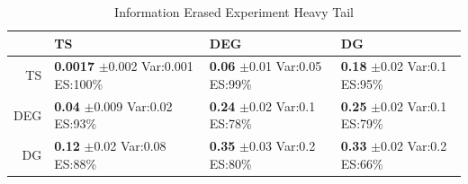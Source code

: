 \documentclass[11pt,letterpaper]{article}
\begin{document}
\begin{table}[H]
\centering
\caption{Information Erased Experiment Heavy Tail} 
\begin{tabular}{rlll}
  \hline
 & TS & DEG &  DG \\ 
  \hline
TS & \makecell{\textbf{0.0017} $\pm$0.002\\Var:0.001\\ES:100\%} & \makecell{\textbf{0.06} $\pm$0.01\\Var:0.05\\ES:99\%} & \makecell{\textbf{0.18} $\pm$0.02\\Var:0.1\\ES:95\%} \\ 
  DEG & \makecell{\textbf{0.04} $\pm$0.009\\Var:0.02\\ES:93\%} & \makecell{\textbf{0.24} $\pm$0.02\\Var:0.1\\ES:78\%} & \makecell{\textbf{0.25} $\pm$0.02\\Var:0.1\\ES:79\%} \\ 
   DG & \makecell{\textbf{0.12} $\pm$0.02\\Var:0.08\\ES:88\%} & \makecell{\textbf{0.35} $\pm$0.03\\Var:0.2\\ES:80\%} & \makecell{\textbf{0.33} $\pm$0.02\\Var:0.2\\ES:66\%} \\ 
   \hline
\end{tabular}
\end{table}
\end{document}
